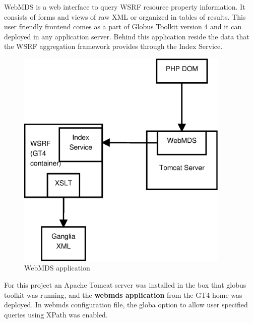 WebMDS is a web interface to query WSRF resource property information. It consists of forms and views of raw XML or organized in tables of results. This user friendly frontend comes as a part of Globus Toolkit version 4 and it can deployed in any application server. Behind this application reside the data that the WSRF aggregation framework provides through the Index Service.

\begin{figure}[htb]
\centering
 \includegraphics[width=4in]{images/webmds.eps}
\caption{WebMDS application}
\label{figure:webmds}
\end{figure}

For this project an Apache Tomcat server was installed in the box that globus toolkit was running, and the {\bf webmds application} from the GT4 home was deployed. In webmds configuration file, the globa option to allow user specified queries using XPath was enabled.
